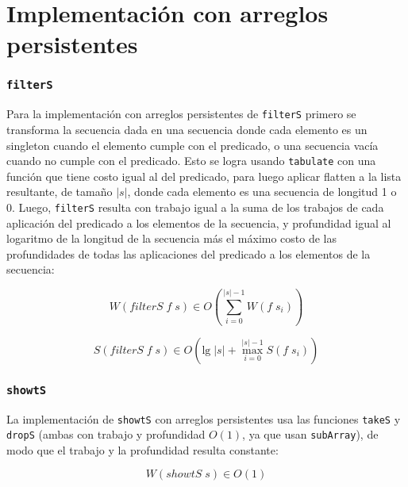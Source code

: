 \documentclass[a4paper,10pt]{article}
\begin{document}
\part*{Implementación con arreglos persistentes}

\section*{\texttt{filterS}}

Para la implementación con arreglos persistentes de \texttt{filterS} primero se
transforma la secuencia dada en una secuencia donde cada elemento es un singleton
cuando el elemento cumple con el predicado, o una secuencia vacía cuando no cumple
con el predicado. Esto se logra usando \texttt{tabulate} con una función que tiene
costo igual al del predicado, para luego aplicar flatten a la lista resultante,
de tamaño $\vert s \vert$, donde cada elemento es una secuencia de longitud 1 o 0.
Luego, \texttt{filterS} resulta con trabajo igual a la suma de los trabajos de
cada aplicación del predicado a los elementos de la secuencia, y profundidad igual
al logaritmo de la longitud de la secuencia más el máximo costo de las profundidades
de todas las aplicaciones del predicado a los elementos de la secuencia:

\begin{equation*}
    W \left( filterS \; f \; s \right) \in
    O \left( \sum_{i=0}^{\vert s \vert -1} W(f \; s_i) \right)
\end{equation*}

\begin{equation*}
    S \left( filterS \; f \; s \right) \in
    O \left( \text{lg} \; \vert s \vert + \max_{i=0}^{\vert s \vert -1} S(f \; s_i) \right)
\end{equation*}


\section*{\texttt{showtS}}

La implementación de \texttt{showtS} con arreglos persistentes usa las funciones
\texttt{takeS} y \texttt{dropS} (ambas con trabajo y profundidad $O \left( 1 \right)$,
ya que usan \texttt{subArray}), de modo que el trabajo y la profundidad resulta
constante:

\begin{equation*}
    W \left( showtS \; s \right) \in
    O \left( 1 \right)
\end{equation*}
\end{document}
